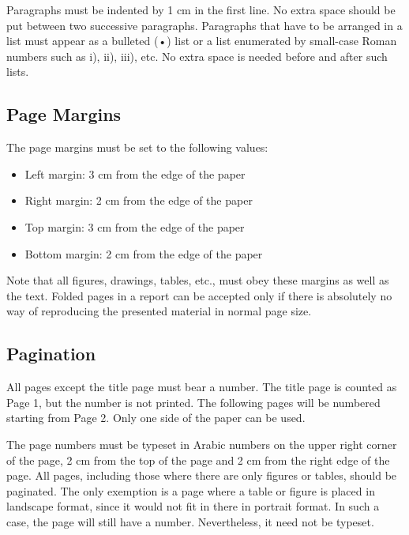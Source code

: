 \documentclass[12pt]{article} %
\numberwithin{equation}{section}
\numberwithin{figure}{section}
\numberwithin{table}{section}
\numberwithin{algorithm}{section}
\begin{document}
Paragraphs must be indented by 1 cm in the first line. No extra space should be put between two successive paragraphs. Paragraphs that have to be arranged in a list must appear as a bulleted (•) list or a list enumerated by small-case Roman numbers such as i), ii), iii), etc. No extra space is needed before and after such lists.

\subsection{Page Margins}

The page margins must be set to the following values:

\begin{itemize}[leftmargin=1.4cm]
    \item Left margin: 3 cm from the edge of the paper
    \item Right margin: 2 cm from the edge of the paper
    \item Top margin: 3 cm from the edge of the paper
    \item Bottom margin: 2 cm from the edge of the paper
\end{itemize}

\setlength{\parindent}{0cm}

Note that all figures, drawings, tables, etc., must obey these margins as well as the text. Folded pages in a report can be accepted only if there is absolutely no way of reproducing the presented material in normal page size.

\setlength{\parindent}{1cm}

\subsection{Pagination}

All pages except the title page must bear a number. The title page is counted as Page 1, but the number is not printed. The following pages will be numbered starting from Page 2. Only one side of the paper can be used.

The page numbers must be typeset in Arabic numbers on the upper right corner of the page, 2 cm from the top of the page and 2 cm from the right edge of the page. All pages, including those where there are only figures or tables, should be paginated. The only exemption is a page where a table or figure is placed in landscape format, since it would not fit in there in portrait format. In such a case, the page will still have a number. Nevertheless, it need not be typeset.
\end{document}
